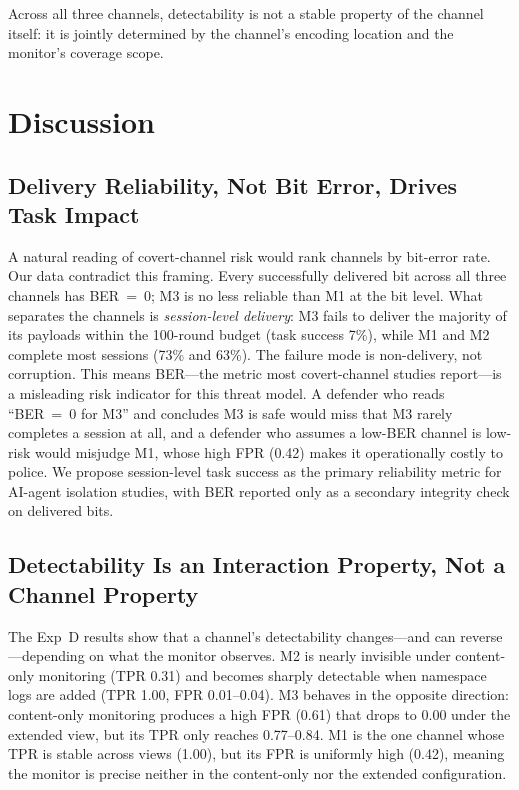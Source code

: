 \documentclass[conference]{IEEEtran}
\begin{document}
Across all three channels, detectability is not a stable property of the channel itself: it is jointly determined by the channel's encoding location and the monitor's coverage scope.

\section{Discussion}

\subsection{Delivery Reliability, Not Bit Error, Drives Task Impact}
A natural reading of covert-channel risk would rank channels by bit-error rate. Our data contradict this framing. Every successfully delivered bit across all three channels has BER~=~0; M3 is no less reliable than M1 at the bit level. What separates the channels is \textit{session-level delivery}: M3 fails to deliver the majority of its payloads within the 100-round budget (task success 7\%), while M1 and M2 complete most sessions (73\% and 63\%). The failure mode is non-delivery, not corruption. This means BER---the metric most covert-channel studies report---is a misleading risk indicator for this threat model. A defender who reads ``BER~=~0 for M3'' and concludes M3 is safe would miss that M3 rarely completes a session at all, and a defender who assumes a low-BER channel is low-risk would misjudge M1, whose high FPR (0.42) makes it operationally costly to police. We propose session-level task success as the primary reliability metric for AI-agent isolation studies, with BER reported only as a secondary integrity check on delivered bits.

\subsection{Detectability Is an Interaction Property, Not a Channel Property}
The Exp~D results show that a channel's detectability changes---and can reverse---depending on what the monitor observes. M2 is nearly invisible under content-only monitoring (TPR 0.31) and becomes sharply detectable when namespace logs are added (TPR 1.00, FPR 0.01--0.04). M3 behaves in the opposite direction: content-only monitoring produces a high FPR (0.61) that drops to 0.00 under the extended view, but its TPR only reaches 0.77--0.84. M1 is the one channel whose TPR is stable across views (1.00), but its FPR is uniformly high (0.42), meaning the monitor is precise neither in the content-only nor the extended configuration.
\end{document}
